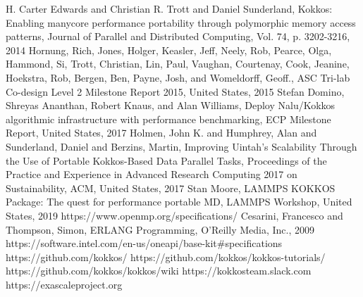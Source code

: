 \documentclass[conference]{IEEEtran}
\begin{document}
\begin{thebibliography}{00}
 H. Carter Edwards and Christian R. Trott and Daniel Sunderland, 
Kokkos: Enabling manycore performance portability through polymorphic memory access patterns, Journal of Parallel and Distributed Computing, Vol. 74, p. 3202-3216, 2014
 Hornung, Rich, Jones, Holger, Keasler, Jeff, Neely, Rob, Pearce, Olga, Hammond, Si, Trott, Christian, Lin, Paul, Vaughan, Courtenay, Cook, Jeanine, Hoekstra, Rob, Bergen, Ben, Payne, Josh, and Womeldorff, Geoff., ASC Tri-lab Co-design Level 2 Milestone Report 2015, United States, 2015
 Stefan Domino, Shreyas Ananthan, Robert Knaus, and Alan Williams, 
Deploy Nalu/Kokkos algorithmic infrastructure with performance benchmarking, ECP Milestone Report, United States, 2017
 Holmen, John K. and Humphrey, Alan and Sunderland, Daniel and Berzins, Martin, Improving Uintah’s Scalability Through the Use of Portable Kokkos-Based Data Parallel Tasks, Proceedings of the Practice and Experience in Advanced Research Computing 2017 on Sustainability, ACM, United States, 2017
 Stan Moore, LAMMPS KOKKOS Package: The quest for performance portable MD, LAMMPS Workshop, United States, 2019
 https://www.openmp.org/specifications/
 Cesarini, Francesco and Thompson, Simon, ERLANG Programming, O’Reilly Media, Inc., 2009
 https://software.intel.com/en-us/oneapi/base-kit\#specifications
 https://github.com/kokkos/
 https://github.com/kokkos/kokkos-tutorials/
 https://github.com/kokkos/kokkos/wiki
 https://kokkosteam.slack.com
 https://exascaleproject.org
\end{thebibliography}
\end{document}
